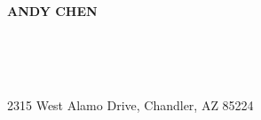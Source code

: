 %	

\begin{minipage}[t]{0.45\textwidth}
	\vspace{-8pt}
	\Huge{\textbf{\uppercase{Andy Chen}}}
	
\end{minipage}
\begin{minipage}[t]{0.05\textwidth}
	\vspace{-8pt}
	\FilledHut\\
	\raisebox{1pt}{\phone}\\
	\Letter\\
\end{minipage}
\begin{minipage}[t]{0.51\textwidth}
	\vspace{-8pt}
	2315 West Alamo Drive, Chandler, AZ 85224\\
	\raisebox{-1pt}{+1 (480) 278 5596}\\
\end{minipage}

